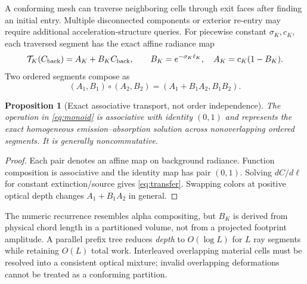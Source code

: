 \documentclass[10pt,letterpaper]{article}
\newtheorem{proposition}{Proposition}
\theoremstyle{remark}\newtheorem{counterexample}[proposition]{Counterexample}
\begin{document}
A conforming mesh can traverse neighboring cells through exit faces after finding an initial entry. Multiple disconnected components or exterior re-entry may require additional acceleration-structure queries. For piecewise constant $\sigma_K,c_K$, each traversed segment has the exact affine radiance map
\begin{equation}
 \mathcal T_K(C_{\rm back})=A_K+B_KC_{\rm back},\qquad
 B_K=e^{-\sigma_K\ell_K},\quad A_K=c_K(1-B_K). \label{eq:transfer}
\end{equation}
Two ordered segments compose as
\begin{equation}
 (A_1,B_1)\circ(A_2,B_2)=(A_1+B_1A_2,B_1B_2). \label{eq:monoid}
\end{equation}
\begin{proposition}[Exact associative transport, not order independence]
The operation in \eqref{eq:monoid} is associative with identity $(0,1)$ and represents the exact homogeneous emission--absorption solution across nonoverlapping ordered segments. It is generally noncommutative.
\end{proposition}
\begin{proof}
Each pair denotes an affine map on background radiance. Function composition is associative and the identity map has pair $(0,1)$. Solving $dC/d\ell$ for constant extinction/source gives \eqref{eq:transfer}. Swapping colors at positive optical depth changes $A_1+B_1A_2$ in general.
\end{proof}

The numeric recurrence resembles alpha compositing, but $B_K$ is derived from physical chord length in a partitioned volume, not from a projected footprint amplitude. A parallel prefix tree reduces \emph{depth} to $O(\log L)$ for $L$ ray segments while retaining $O(L)$ total work. Interleaved overlapping material cells must be resolved into a consistent optical mixture; invalid overlapping deformations cannot be treated as a conforming partition.
\end{document}

